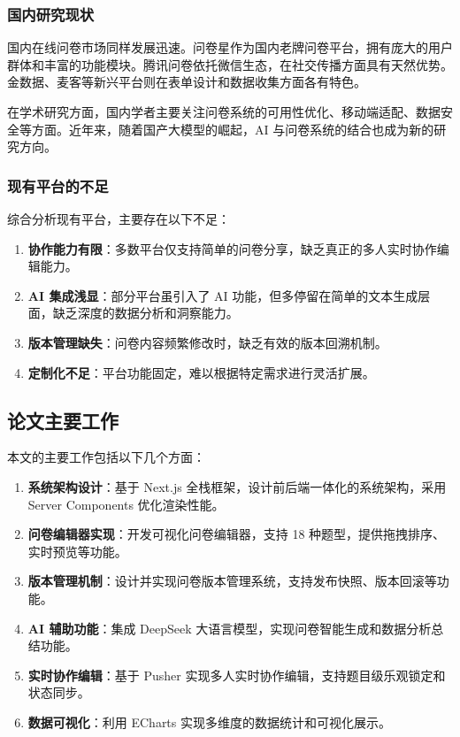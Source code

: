 \subsubsection{国内研究现状}

国内在线问卷市场同样发展迅速。问卷星作为国内老牌问卷平台，拥有庞大的用户群体和丰富的功能模块。腾讯问卷依托微信生态，在社交传播方面具有天然优势。金数据、麦客等新兴平台则在表单设计和数据收集方面各有特色。

在学术研究方面，国内学者主要关注问卷系统的可用性优化、移动端适配、数据安全等方面。近年来，随着国产大模型的崛起，AI 与问卷系统的结合也成为新的研究方向。

\subsubsection{现有平台的不足}

综合分析现有平台，主要存在以下不足：

\begin{enumerate}[label=(\arabic*)]
  \item \textbf{协作能力有限}：多数平台仅支持简单的问卷分享，缺乏真正的多人实时协作编辑能力。
  \item \textbf{AI 集成浅显}：部分平台虽引入了 AI 功能，但多停留在简单的文本生成层面，缺乏深度的数据分析和洞察能力。
  \item \textbf{版本管理缺失}：问卷内容频繁修改时，缺乏有效的版本回溯机制。
  \item \textbf{定制化不足}：平台功能固定，难以根据特定需求进行灵活扩展。
\end{enumerate}

\subsection{论文主要工作}

本文的主要工作包括以下几个方面：

\begin{enumerate}[label=(\arabic*)]
  \item \textbf{系统架构设计}：基于 Next.js 全栈框架，设计前后端一体化的系统架构，采用 Server Components 优化渲染性能。
  
  \item \textbf{问卷编辑器实现}：开发可视化问卷编辑器，支持 18 种题型，提供拖拽排序、实时预览等功能。
  
  \item \textbf{版本管理机制}：设计并实现问卷版本管理系统，支持发布快照、版本回滚等功能。
  
  \item \textbf{AI 辅助功能}：集成 DeepSeek 大语言模型，实现问卷智能生成和数据分析总结功能。
  
  \item \textbf{实时协作编辑}：基于 Pusher 实现多人实时协作编辑，支持题目级乐观锁定和状态同步。
  
  \item \textbf{数据可视化}：利用 ECharts 实现多维度的数据统计和可视化展示。
\end{enumerate}

